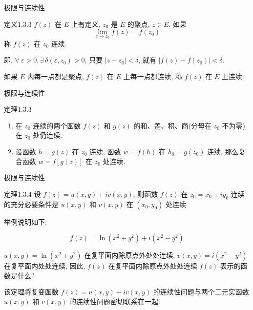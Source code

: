\documentclass{beamer}
\begin{document}
\begin{frame}{极限与连续性}
\begin{block}{定义1.3.3}
 $ f(z) $ 在 $ E $ 上有定义, $ z_0 $ 是 $ E $ 的聚点, $ z\in E $. 如果
\[\lim\limits_{z \to {z_0}} f ( z ) = f ( {z_0} ) \]
称 $ f(z) $ 在 $ z_0 $ 连续. 
\bigskip


即,  $ \forall\: \varepsilon >0, \exists\: \delta (\varepsilon, z_0)>0 $,  只要 $ |z- z_0|<\delta $, 就有 $ | f(z) - f(z_0) |<\delta $. 

\bigskip

如果 $ E $ 内每一点都是聚点, $ f(z) $ 在 $ E $ 上每一点都连续, 称 $ f(z) $ 在 $ E $ 上连续. 
\end{block}

\end{frame}

\begin{frame}{极限与连续性}
\begin{block}{定理1.3.3}
\begin{enumerate}
	\item 在 $ z_0 $ 连续的两个函数 $ f(z) $ 和 $ g(z) $ 的和、差、积、商(分母在 $ z_0 $ 不为零)在 $ z_0 $ 处仍连续.
	\item 设函数 $ h=g(z) $ 在 $ z_0 $ 连续, 函数 $ w=f(h) $ 在 $ h_0=g(z_0) $ 连续, 那么复合函数 $ w=f [g(z)] $ 在 $ z_0 $ 处连续.
\end{enumerate}
\end{block}


\end{frame}

\begin{frame}{极限与连续性}

\begin{block}{定理1.3.4}
	设 $ f(z)=u(x, y)+iv(x, y) $, 则函数 $ f(z) $ 在 $ z_0=x_0+iy_0 $ 连续的充分必要条件是 $ u(x, y) $ 和 $ v(x, y) $ 在 $ (x_0, y_0) $ 处连续
	
	举例说明如下: 
	
	\[ f(z)=\ln(x^2+y^2)+i(x^2-y^2) \]
	
	$ u(x, y) = \ln(x^2+y^2) $ 在复平面内除原点外处处连续, $ v(x, y)=i(x^2-y^2) $ 在复平面内处处连续, 因此, $ f(z) $ 在复平面内除原点外处处连续 $ f(z) $ 表示的函数是什么? 
	
\end{block}


该定理将复变函数 $ f(z) = u(x, y) + iv(x, y) $ 的连续性问题与两个二元实函数 $ u(x, y) $ 和 $ v(x, y) $ 的连续性问题密切联系在一起.
\end{frame}
\end{document}
